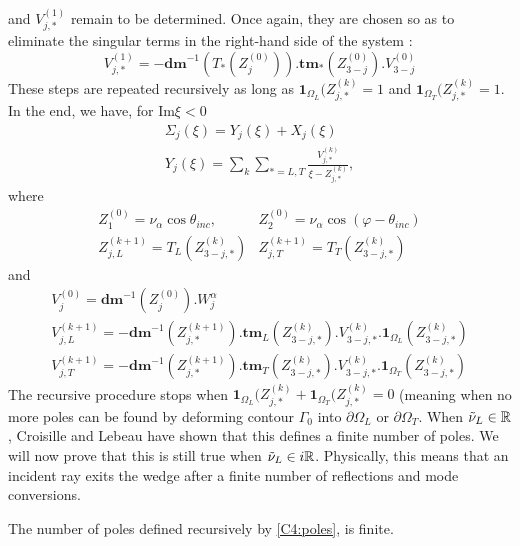 and $V_{j,*}^{(1)}$ remain to be determined. Once again, they are chosen so as to eliminate the singular terms in the right-hand side of the system :
\begin{equation}
V_{j,*}^{(1)}=-\mathbf{dm}^{-1}(T_*(Z_{j}^{(0)})).\mathbf{tm_*}(Z_{3-j}^{(0)}).V_{3-j}^{(0)}
\end{equation}
These steps are repeated recursively as long as $\textbf{1}_{\Omega_L}(Z_{j,*}^{(k)}=1$ and $\textbf{1}_{\Omega_T}(Z_{j,*}^{(k)}=1$. In the end, we have, for  $\mbox{Im} \xi <0$
\begin{gather}
\Sigma_j(\xi)=Y_j(\xi)+X_j(\xi) \label{C4:decomp}\\
Y_j(\xi)=\sum_k \sum_{*=L,T} \frac{V_{j,*}^{(k)}}{\xi-Z_{j,*}^{(k)}}
\label{C4:yj},
\end{gather}
where
\begin{equation}
\begin{matrix}
Z_{1}^{(0)}=\nu_{\alpha} \cos \theta_{inc},  & Z_{2}^{(0)}=\nu_{\alpha} \cos(\varphi-\theta_{inc}) \\
Z_{j,L}^{(k+1)}= T_L(Z_{3-j,*}^{(k)}) &Z_{j,T}^{(k+1)}= T_T(Z_{3-j,*}^{(k)}) 
\end{matrix}
\label{C4:poles}
\end{equation}
and
\begin{equation}
\begin{matrix}
V_{j}^{(0)}=\textbf{dm}^{-1}(Z_{j}^{(0)}).W_j^{\alpha}\\
V_{j,L}^{(k+1)}=-\textbf{dm}^{-1}(Z_{j,*}^{(k+1)}).\textbf{tm}_L(Z_{3-j,*}^{(k)}).V_{3-j,*}^{(k)}.\textbf{1}_{\Omega_L}(Z_{3-j,*}^{(k)}) \\ 
V_{j,T}^{(k+1)}=-\textbf{dm}^{-1}(Z_{j,*}^{(k+1)}).\textbf{tm}_T(Z_{3-j,*}^{(k)}).V_{3-j,*}^{(k)}.\textbf{1}_{\Omega_T}(Z_{3-j,*}^{(k)}) 
\end{matrix}
\label{C4:residus}
\end{equation}
The recursive procedure stops when $\textbf{1}_{\Omega_L}(Z_{j,*}^{(k)}+\textbf{1}_{\Omega_T}(Z_{j,*}^{(k)}=0$ (meaning when no more poles can be found by deforming contour $\Gamma_0$ into $\partial \Omega_L$ or $\partial \Omega_T$. When $\tilde{\nu}_L \in \mathbb{R}$, Croisille and Lebeau \cite{CroisilleLebeau} have shown that this defines a finite number of poles. We will now prove that this is still true when $\tilde{\nu}_L \in i\mathbb{R}$. Physically, this means that an incident ray exits the wedge after a finite number of reflections and mode conversions.
\begin{lemma}
The number of poles defined recursively by \eqref{C4:poles}, is finite.
\label{C4:finipoles}
\end{lemma}
